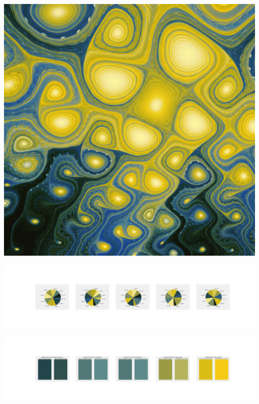 \documentclass[11pt]{article}
\begin{document}
\begin{landscape}
    \begin{center}
    \includegraphics[width=\textwidth]{./nbimg/file (304).jpg}
    \end{center}

    \begin{center}
    \includegraphics[width=250mm]{./nbimg/pie-228.jpg}
    \end{center}

    \begin{center}
    \includegraphics[width=250mm]{./nbimg/peak-228.jpg}
    \end{center}
    


\end{landscape}
\end{document}
